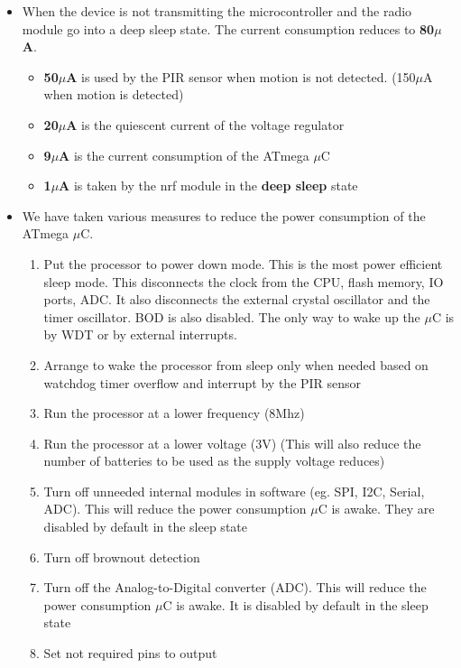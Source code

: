 \documentclass[journal]{IEEEtran}
\begin{document}
\begin{itemize}	
	\item When the device is not transmitting the microcontroller and the radio module go into a deep sleep state. The current consumption reduces to \textbf{80$\mu$A}. 
	\begin{itemize}
		\item \textbf{50$\mu$A} is used by the PIR sensor when motion is not detected. (150$\mu$A when motion is detected)
		\item \textbf{20$\mu$A} is the quiescent current of the voltage regulator
		\item \textbf{9$\mu$A} is the current consumption of the ATmega $\mu$C
		\item \textbf{1$\mu$A} is taken by the nrf module in the \textbf{deep sleep} state
	\end{itemize}
	
	\item We have taken various measures to reduce the power consumption of the ATmega $\mu$C.
	\begin{enumerate}
		\item Put the processor to power down mode. This is the most power efficient sleep mode. This disconnects the clock from the CPU, flash memory, IO ports, ADC. It also disconnects the external crystal oscillator and the timer oscillator. BOD is also disabled. The only way to wake up the $\mu$C is by WDT or by external interrupts.
		\item Arrange to wake the processor from sleep only when needed based on watchdog timer overflow and interrupt by the PIR sensor
		\item Run the processor at a lower frequency (8Mhz)
		\item Run the processor at a lower voltage (3V) (This will also reduce the number of batteries to be used as the supply voltage reduces)
		\item Turn off unneeded internal modules in software (eg. SPI, I2C, Serial, ADC). This will reduce the power consumption $\mu$C is awake. They are disabled by default in the sleep state
		\item Turn off brownout detection
		\item Turn off the Analog-to-Digital converter (ADC). This will reduce the power consumption $\mu$C is awake. It is disabled by default in the sleep state
		\item Set not required pins to output
	\end{enumerate} 
\end{itemize}
\end{document}
